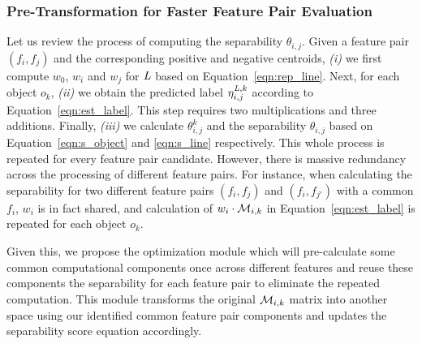 \subsubsection{Pre-Transformation for Faster Feature Pair Evaluation} \label{ssec:trans}

Let us review the process of computing the separability $\theta_{i,j}$. Given a feature pair $(f_i,f_j)$ and the corresponding positive and negative centroids, {\em (i)} we first compute $w_0$, $w_i$ and $w_j$ for $\mathit{L}$ based on Equation~\ref{eqn:rep_line}. Next, for each object $o_k$, {\em (ii)} we obtain the predicted label $\eta_{i,j}^{\mathit{L},k}$ according to Equation~\ref{eqn:est_label}. This step requires two multiplications and three additions. Finally, {\em (iii)} we calculate $\theta_{i,j}^{k}$ and the separability $\theta_{i,j}$ based on Equation~\ref{eqn:s_object} and \ref{eqn:s_line} respectively. This whole process is repeated for every feature pair candidate. However, there is massive redundancy across the processing of different feature pairs. For instance, when calculating the separability for two different feature pairs $(f_i,f_j)$ and $(f_i,f_{j'})$ with a common $f_i$, $w_i$ is in fact shared, and calculation of $w_i\cdot {\mathcal{M}}_{i,k}$ in Equation~\ref{eqn:est_label} is repeated for each object $o_k$.

Given this, we propose the \trans optimization module which will pre-calculate some common computational components once across different features and reuse these components the separability for each feature pair to eliminate the repeated computation. This \trans module transforms the original ${\mathcal{M}}_{i,k}$ matrix into another space using our identified common feature pair components and updates the separability score equation accordingly.

